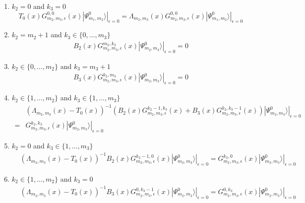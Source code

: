 \documentclass[11pt]{article}
\numberwithin{equation}{section}
\numberwithin{equation}{subsection}
\begin{document}
\begin{enumerate}
	\item $k_{2}=0$ and $k_{3}=0$
	\begin{equation}\label{cond1}
		T_{0}(x)G_{m_{2},m_{3},\epsilon}^{0,0}(x)|\Psi_{m_{1},m_{2}}^{0}\rangle|_{\epsilon=0}=\Lambda_{m_{2},m_{3}}(x)G_{m_{2},m_{3},\epsilon}^{0,0}(x)|\Psi_{m_{1},m_{2}}^{0}\rangle|_{\epsilon=0}
	\end{equation}
	\item $k_{2}=m_{2}+1$ and $k_{3}\in \{0,\ldots,m_{3}\}$
	\begin{equation}\label{cond2}
		\begin{split}
			B_{2}(x)G_{m_{2},m_{3},\epsilon}^{m_{2},k_{3}}(x)|\Psi_{m_{2},m_{3}}^{0}\rangle|_{\epsilon=0}=0
		\end{split}
	\end{equation}
	\item $k_{2}\in\{0,\ldots,m_{2}\}$ and $k_{3}=m_{3}+1$
	\begin{equation}\label{cond3}
		\begin{split}
			B_{3}(x)G_{m_{2},m_{3},\epsilon}^{k_{2},m_{3}}(x)|\Psi_{m_{2},m_{3}}^{0}\rangle|_{\epsilon=0}=0
		\end{split}
	\end{equation}
	\item $k_{2}\in \{1,\ldots,m_{2}\}$ and $k_{3}\in\{1,\ldots,m_{3}\}$ 
	\begin{equation}\label{cond4}
		\begin{split}
			&\left(\Lambda_{m_{2},m_{3}}(x)-T_{0}(x)\right)^{-1}\left(B_{2}(x)G_{m_{2},m_{3},\epsilon}^{k_{2}-1,k_{3}}(x)+B_{3}(x)G_{m_{2},m_{3},\epsilon}^{k_{2},k_{3}-1}(x)\right)|\Psi_{m_{2},m_{3}}^{0}\rangle|_{\epsilon=0}
			\\=&
			G_{m_{2},m_{3},\epsilon}^{k_{2},k_{3}}(x)|\Psi_{m_{2},m_{3}}^{0}\rangle|_{\epsilon=0}
		\end{split}
	\end{equation} 
\item $k_{2}=0$ and $k_{3}\in\{1,\ldots,m_{3}\}$
\begin{equation}\label{cond5}
	\begin{split}
		&	\left(\Lambda_{m_{2},m_{3}}(x)-T_{0}(x)\right)^{-1}B_{2}(x)G_{m_{2},m_{3},\epsilon}^{k_{2}-1,0}(x)|\Psi_{m_{2},m_{3}}^{0}\rangle|_{\epsilon=0}
		=
	G_{m_{2},m_{3},\epsilon}^{k_{2},0}(x)|\Psi_{m_{2},m_{3}}^{0}\rangle|_{\epsilon=0}
	\end{split}
\end{equation}
\item $k_{2}\in \{1,\ldots,m_{2}\}$ and $k_{3}=0$
	\begin{equation}\label{cond6}
		\begin{split}
			&\left(\Lambda_{m_{2},m_{3}}(x)-T_{0}(x)\right)^{-1}B_{3}(x)G_{m_{2},m_{3},\epsilon}^{0,k_{3}-1}(x)|\Psi_{m_{2},m_{3}}^{0}\rangle|_{\epsilon=0}
			=
	G_{m_{2},m_{3},\epsilon}^{0,k_{3}}(x)|\Psi_{m_{2},m_{3}}^{0}\rangle|_{\epsilon=0}
		\end{split}
	\end{equation}
	
\end{enumerate}
\end{document}
